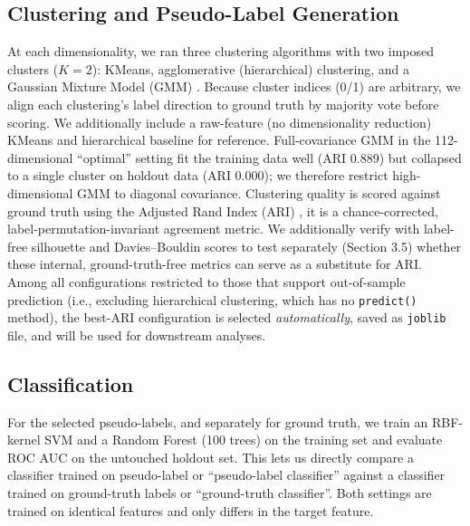 \documentclass[sigconf]{acmart}
\begin{document}
\subsection{Clustering and Pseudo-Label Generation}
At each dimensionality, we ran three clustering algorithms with two imposed clusters ($K=2$): KMeans, agglomerative (hierarchical) clustering, and a Gaussian Mixture Model (GMM) \cite{jain2010clustering}. Because cluster indices (0/1) are arbitrary, we align each clustering's label direction to ground truth by majority vote before scoring. We additionally include a raw-feature (no dimensionality reduction) KMeans and hierarchical baseline for reference. Full-covariance GMM in the 112-dimensional ``optimal'' setting fit the training data well (ARI 0.889) but collapsed to a single cluster on holdout data (ARI 0.000); we therefore restrict high-dimensional GMM to diagonal covariance. Clustering quality is scored against ground truth using the Adjusted Rand Index (ARI) \cite{hubert1985comparing}, it is a chance-corrected, label-permutation-invariant agreement metric. We additionally verify with label-free silhouette and Davies--Bouldin scores to test
separately (Section 3.5) whether these internal, ground-truth-free
metrics can serve as a substitute for ARI. Among all configurations restricted to those that support out-of-sample prediction (i.e., excluding hierarchical clustering, which has no \texttt{predict()} method), the best-ARI configuration is selected \emph{automatically}, saved as \texttt{joblib} file, and will be used for downstream analyses.


\subsection{Classification}
For the selected pseudo-labels, and separately for ground truth, we train an RBF-kernel SVM and a Random Forest (100 trees) \cite{cortes1995support, breiman2001random} on the training set and evaluate ROC AUC on the untouched holdout set. This lets us directly compare a classifier trained on pseudo-label or ``pseudo-label classifier'' against a classifier  trained on ground-truth labels or ``ground-truth classifier''. Both settings are trained on identical features and only differs in the target feature.
\end{document}
